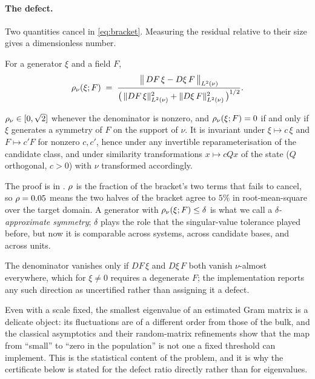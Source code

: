 \paragraph{The defect.} Two quantities cancel in \eqref{eq:bracket}. Measuring
the residual relative to their size gives a dimensionless number.

\begin{definition}
\label{def:defect}
For a generator $\xi$ and a field $F$,
\begin{equation}
  \rho_\nu(\xi; F) \;=\;
  \frac{\bigl\| \,DF\,\xi - D\xi\,F\, \bigr\|_{L^2(\nu)}}
       {\bigl(\,\|DF\,\xi\|_{L^2(\nu)}^{2}
        + \|D\xi\,F\|_{L^2(\nu)}^{2}\,\bigr)^{1/2}} .
\end{equation}
\end{definition}

\begin{lemma}[Properties]
\label{lem:props}
$\rho_\nu \in [0,\sqrt 2]$ whenever the denominator is nonzero, and
$\rho_\nu(\xi;F)=0$ if and only if $\xi$ generates a symmetry of $F$ on the
support of $\nu$. It is invariant under $\xi \mapsto c\,\xi$ and $F \mapsto
c'F$ for nonzero $c,c'$, hence under any invertible reparameterisation of the
candidate class, and under similarity transformations $x \mapsto cQx$ of the
state ($Q$ orthogonal, $c>0$) with $\nu$ transformed accordingly.
\end{lemma}

The proof is in . $\rho$ is the fraction of the bracket's
two terms that fails to cancel, so $\rho = 0.05$ means the two halves of
the bracket agree to $5\%$ in root-mean-square over the target domain. A
generator with $\rho_\nu(\xi;F) \le \delta$ is what we call a
\emph{$\delta$-approximate symmetry}; $\delta$ plays the role that the
singular-value tolerance played before, but now it is comparable across
systems, across candidate bases, and across units.

The denominator vanishes only if $DF\,\xi$ and $D\xi\,F$ both vanish
$\nu$-almost everywhere, which for $\xi \neq 0$ requires a degenerate $F$; the
implementation reports any such direction as uncertified rather than assigning
it a defect.

\begin{remark}
Even with a scale fixed, the smallest eigenvalue of an estimated Gram matrix is
a delicate object: its fluctuations are of a different order from those of the
bulk, and the classical asymptotics \citep{anderson1963asymptotic} and their
random-matrix refinements \citep{johnstone2001distribution,baik2005phase} show
that the map from ``small'' to ``zero in the population'' is not one a fixed
threshold can implement. This is the statistical content of the problem, and it
is why the certificate below is stated for the defect ratio directly rather than
for eigenvalues.
\end{remark}

